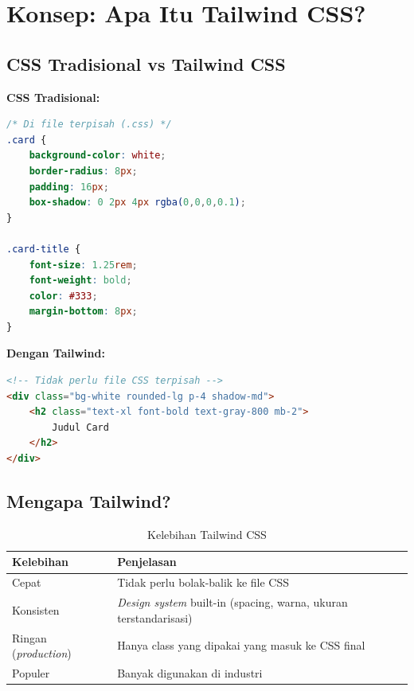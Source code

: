 \section{Konsep: Apa Itu Tailwind CSS?}
\label{sec:12-konsep}

\subsection{CSS Tradisional vs Tailwind CSS}

\textbf{CSS Tradisional:}

\begin{lstlisting}[language=CSS, caption={Penulisan CSS tradisional}, label={lst:12-css-tradisional}]
/* Di file terpisah (.css) */
.card {
    background-color: white;
    border-radius: 8px;
    padding: 16px;
    box-shadow: 0 2px 4px rgba(0,0,0,0.1);
}

.card-title {
    font-size: 1.25rem;
    font-weight: bold;
    color: #333;
    margin-bottom: 8px;
}
\end{lstlisting}

\textbf{Dengan Tailwind:}

\begin{lstlisting}[language=HTML, caption={Penulisan dengan Tailwind CSS}, label={lst:12-tailwind}]
<!-- Tidak perlu file CSS terpisah -->
<div class="bg-white rounded-lg p-4 shadow-md">
    <h2 class="text-xl font-bold text-gray-800 mb-2">
        Judul Card
    </h2>
</div>
\end{lstlisting}

\subsection{Mengapa Tailwind?}

\begin{table}[htbp]
\centering
\caption{Kelebihan Tailwind CSS}
\label{tab:12-kelebihan}
\begin{tabular}{ll}
\toprule
\textbf{Kelebihan} & \textbf{Penjelasan} \\
\midrule
Cepat & Tidak perlu bolak-balik ke file CSS \\
Konsisten & \emph{Design system} built-in (spacing, warna, ukuran terstandarisasi) \\
Ringan (\emph{production}) & Hanya class yang dipakai yang masuk ke CSS final \\
Populer & Banyak digunakan di industri \\
\bottomrule
\end{tabular}
\end{table}

